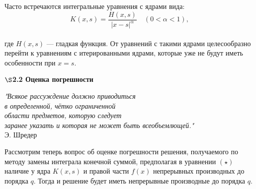\documentclass[12pt]{article}
\begin{document}
Часто встречаются интегральные уравнения с ядрами вида:\\
$$ K(x,s) = \frac{H(x,s)}{|x-s|^{\alpha}} \quad (0 < \alpha < 1) , $$ \\
где $ H(x,s) $ — гладкая функция. От уравнений с такими ядрами целесообразно перейти к уравнениям с итерированными ядрами, которые уже не будут иметь особенности при $ x = s $.  \\
\newpage
\begin{center}
	\textbf{$ \S $2.2 Оценка погрешности }
\end{center}
\begin{flushright}
	\textit{	"Всякое рассуждение должно приводиться\\
		в определенной, чётко ограниченной\\
		области предметов, которую следует\\
		заранее указать и которая не может быть всеобъемлющей."}\\
	Э. Шредер
\end{flushright}

Рассмотрим теперь вопрос об оценке погрешности решения, получаемого по методу замены интеграла конечной суммой, предполагая в уравнении $ (\star) $ наличие у ядра $ K(x,s) $ и правой части $ f(x) $ непрерывных производных до порядка $ q $. Тогда и решение будет иметь непрерывные производные до порядка $ q $.\\
\end{document}
